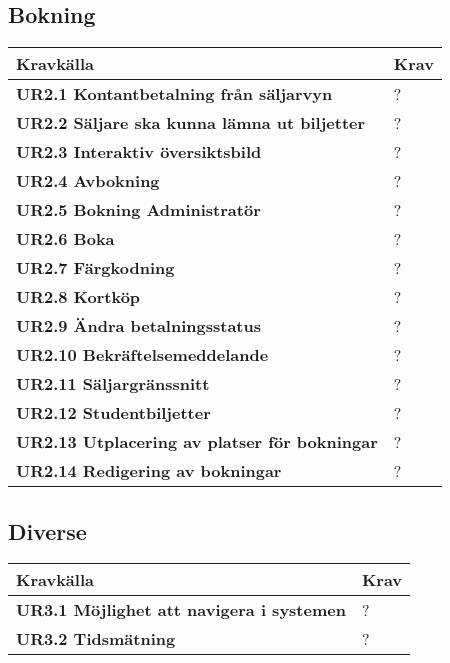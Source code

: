 \documentclass[a4paper, twoside, 11pt, titlepage]{article}
\begin{document}
	\subsection{Bokning}


	\begin {table} [ht] \begin{tabular} {  p{5.5cm} p{9.6cm} }
		\hline
		\sffamily\textbf{Kravkälla} & \sffamily\textbf{Krav } \\
		\hline
		\sffamily\textbf{UR2.1 Kontantbetalning från säljarvyn} & ?  \\
		\hline
		\sffamily\textbf{UR2.2 Säljare ska kunna lämna ut biljetter} & ?  \\
		\hline
		\sffamily\textbf{UR2.3 Interaktiv översiktsbild} & ?  \\
		\hline
		\sffamily\textbf{UR2.4 Avbokning} & ?  \\
		\hline
		\sffamily\textbf{UR2.5 Bokning Administratör} & ?  \\
		\hline
		\sffamily\textbf{UR2.6 Boka} & ?  \\
		\hline
		\sffamily\textbf{UR2.7 Färgkodning} & ?  \\
		\hline
		\sffamily\textbf{UR2.8 Kortköp} & ?  \\
		\hline
		\sffamily\textbf{UR2.9 Ändra betalningsstatus} & ?  \\
		\hline
		\sffamily\textbf{UR2.10 Bekräftelsemeddelande} & ?  \\
		\hline
		\sffamily\textbf{UR2.11 Säljargränssnitt} & ?  \\
		\hline
		\sffamily\textbf{UR2.12 Studentbiljetter} & ?  \\
		\hline
		\sffamily\textbf{UR2.13 Utplacering av platser för bokningar} & ?  \\
		\hline
		\sffamily\textbf{UR2.14 Redigering av bokningar} & ?  \\
		\hline
	\end{tabular} \end{table} \FloatBarrier


	\subsection{Diverse}


	\begin {table} [ht] \begin{tabular} {  p{5.5cm} p{9.6cm} }
		\hline
		\sffamily\textbf{Kravkälla} & \sffamily\textbf{Krav } \\
		\hline
		\sffamily\textbf{UR3.1 Möjlighet att navigera i systemen} & ?  \\
		\hline
		\sffamily\textbf{UR3.2 Tidsmätning} & ?  \\
		\hline
	\end{tabular} \end{table} \FloatBarrier
\end{document}

